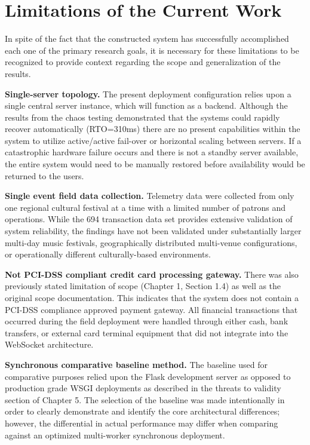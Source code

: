 \section{Limitations of the Current Work}
In spite of the fact that the constructed system has successfully accomplished each one of the primary research goals, it is necessary for these limitations to be recognized to provide context regarding the scope and generalization of the results.

\textbf{Single-server topology.} The present deployment configuration relies upon a single central server instance, which will function as a backend. Although the results from the chaos testing demonstrated that the systems could rapidly recover automatically (RTO=310ms) there are no present capabilities within the system to utilize active/active fail-over or horizontal scaling between servers. If a catastrophic hardware failure occurs and there is not a standby server available, the entire system would need to be manually restored before availability would be returned to the users.

\textbf{Single event field data collection.} Telemetry data were collected from only one regional cultural festival at a time with a limited number of patrons and operations. While the 694 transaction data set provides extensive validation of system reliability, the findings have not been validated under substantially larger multi-day music festivals, geographically distributed multi-venue configurations, or operationally different culturally-based environments.

\textbf{Not PCI-DSS compliant credit card processing gateway.} There was also previously stated limitation of scope (Chapter 1, Section 1.4) as well as the original scope documentation. This indicates that the system does not contain a PCI-DSS compliance approved payment gateway. All financial transactions that occurred during the field deployment were handled through either cash, bank transfers, or external card terminal equipment that did not integrate into the WebSocket architecture.

\textbf{Synchronous comparative baseline method.} The baseline used for comparative purposes relied upon the Flask development server as opposed to production grade WSGI deployments as described in the threats to validity section of Chapter 5. The selection of the baseline was made intentionally in order to clearly demonstrate and identify the core architectural differences; however, the differential in actual performance may differ when comparing against an optimized multi-worker synchronous deployment.

